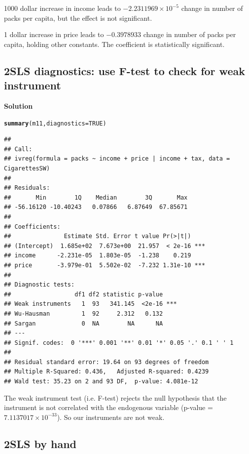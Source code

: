 \documentclass{article}\usepackage[]{graphicx}\usepackage[]{color}
\makeatletter
\newcommand{\hlnum}[1]{\textcolor[rgb]{0.686,0.059,0.569}{#1}}%
\newcommand{\hlstd}[1]{\textcolor[rgb]{0.345,0.345,0.345}{#1}}%
\newcommand{\hlkwc}[1]{\textcolor[rgb]{0.333,0.667,0.333}{#1}}%
\newcommand{\hlkwd}[1]{\textcolor[rgb]{0.737,0.353,0.396}{\textbf{#1}}}%
\newenvironment{kframe}{%
 \def\at@end@of@kframe{}%
 \ifinner\ifhmode%
  \def\at@end@of@kframe{\end{minipage}}%
  \begin{minipage}{\columnwidth}%
 \fi\fi%
 \def\FrameCommand##1{\hskip\@totalleftmargin \hskip-\fboxsep
 \colorbox{shadecolor}{##1}\hskip-\fboxsep
     \hskip-\linewidth \hskip-\@totalleftmargin \hskip\columnwidth}%
 \MakeFramed {\advance\hsize-\width
   \@totalleftmargin\z@ \linewidth\hsize
   \@setminipage}}%
 {\par\unskip\endMakeFramed%
 \at@end@of@kframe}
\newenvironment{knitrout}{}{} %
\makeatother
\begin{document}
1000 dollar increase in income leads to \ensuremath{-2.2311969\times 10^{-5}} change in number of packs per capita, but the effect is not significant.

1 dollar increase in price leads to \ensuremath{-0.3978933} change in number of packs per capita, holding other constants. The coefficient is statistically significant.

\subsection{2SLS diagnostics: use F-test to check for weak instrument}

\textbf{Solution}

\begin{knitrout}
\color{fgcolor}\begin{kframe}
\begin{alltt}
\hlkwd{summary}\hlstd{(m11,} \hlkwc{diagnostics} \hlstd{=} \hlnum{TRUE}\hlstd{)}
\end{alltt}
\begin{verbatim}
## 
## Call:
## ivreg(formula = packs ~ income + price | income + tax, data = CigarettesSW)
## 
## Residuals:
##       Min        1Q    Median        3Q       Max 
## -56.16120 -10.40243   0.07866   6.87649  67.85671 
## 
## Coefficients:
##               Estimate Std. Error t value Pr(>|t|)    
## (Intercept)  1.685e+02  7.673e+00  21.957  < 2e-16 ***
## income      -2.231e-05  1.803e-05  -1.238    0.219    
## price       -3.979e-01  5.502e-02  -7.232 1.31e-10 ***
## 
## Diagnostic tests:
##                  df1 df2 statistic p-value    
## Weak instruments   1  93   341.145  <2e-16 ***
## Wu-Hausman         1  92     2.312   0.132    
## Sargan             0  NA        NA      NA    
## ---
## Signif. codes:  0 '***' 0.001 '**' 0.01 '*' 0.05 '.' 0.1 ' ' 1
## 
## Residual standard error: 19.64 on 93 degrees of freedom
## Multiple R-Squared: 0.436,	Adjusted R-squared: 0.4239 
## Wald test: 35.23 on 2 and 93 DF,  p-value: 4.081e-12
\end{verbatim}
\end{kframe}
\end{knitrout}

The weak instrument test (i.e. F-test) rejects the null hypothesis that the instrument is not correlated with the endogenous variable (p-value = \ensuremath{7.1137017\times 10^{-33}}). So our instruments are not weak.

\subsection{2SLS by hand}
\end{document}
